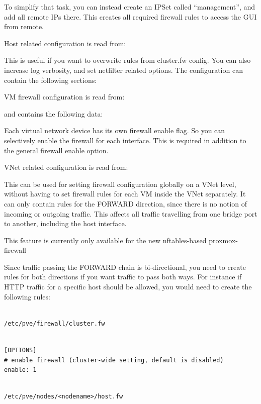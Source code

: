 To simplify that task, you can instead create an IPSet called “management”, and add all remote IPs there. This creates all required firewall rules to access the GUI from remote.

Host related configuration is read from:

This is useful if you want to overwrite rules from cluster.fw config. You can also increase log verbosity, and set netfilter related options. The configuration can contain the following sections:

VM firewall configuration is read from:

and contains the following data:

Each virtual network device has its own firewall enable flag. So you can selectively enable the firewall for each interface. This is required in addition to the general firewall enable option.

VNet related configuration is read from:

This can be used for setting firewall configuration globally on a VNet level, without having to set firewall rules for each VM inside the VNet separately. It can only contain rules for the FORWARD direction, since there is no notion of incoming or outgoing traffic. This affects all traffic travelling from one bridge port to another, including the host interface.

This feature is currently only available for the new nftables-based proxmox-firewall

Since traffic passing the FORWARD chain is bi-directional, you need to create rules for both directions if you want traffic to pass both ways. For instance if HTTP traffic for a specific host should be allowed, you would need to create the following rules:

\begin{lstlisting}

/etc/pve/firewall/cluster.fw

\end{lstlisting}

\begin{lstlisting}

[OPTIONS]
# enable firewall (cluster-wide setting, default is disabled)
enable: 1

\end{lstlisting}

\begin{lstlisting}

/etc/pve/nodes/<nodename>/host.fw

\end{lstlisting}

